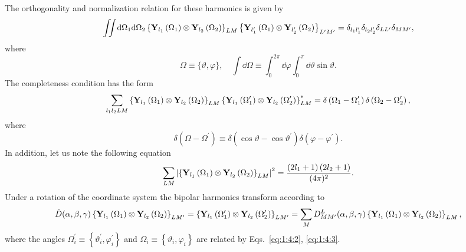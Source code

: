The orthogonality and normalization relation for these harmonics is given by
\begin{equation}
\iint \mathrm{d} \Omega_{1} \mathrm{d} \Omega_{2}\left\{\mathbf{Y}_{l_{1}}\left(\Omega_{1}\right) \otimes \mathbf{Y}_{l_{2}}\left(\Omega_{2}\right)\right\}_{L M}\left\{\mathbf{Y}_{l_{1}^{\prime}}\left(\Omega_{1}\right) \otimes \mathbf{Y}_{l_{2}^{\prime}}\left(\Omega_{2}\right)\right\}_{L^{\prime} M^{\prime}}=\delta_{l_{1} l_{1}^{\prime}} \delta_{l_{2} l_{2}^{\prime}} \delta_{L L^{\prime}} \delta_{M M^{\prime}}, \label{eq:5:16:2}
\end{equation}
where
\[
\Omega \equiv\{\vartheta, \varphi\}, \quad \int \dd \Omega \equiv \int_{0}^{2 \pi} \dd \varphi \int_{0}^{\pi} \dd \vartheta \sin \vartheta.
\]
The completeness condition has the form
\begin{equation}
\sum_{l_{1} l_{2} L M}\left\{\mathbf{Y}_{l_{1}}\left(\Omega_{1}\right) \otimes \mathbf{Y}_{l_{2}}\left(\Omega_{2}\right)\right\}_{L M}\left\{\mathbf{Y}_{l_{1}}\left(\Omega_{1}^{\prime}\right) \otimes \mathbf{Y}_{l_{2}}\left(\Omega_{2}^{\prime}\right)\right\}_{L M}^{*}=\delta\left(\Omega_{1}-\Omega_{1}^{\prime}\right) \delta\left(\Omega_{2}-\Omega_{2}^{\prime}\right), \label{eq:5:16:3}
\end{equation}
where
\[
\delta\left(\Omega-\Omega^{\prime}\right) \equiv \delta\left(\cos \vartheta-\cos \vartheta^{\prime}\right) \delta\left(\varphi-\varphi^{\prime}\right) .
\]
In addition, let us note the following equation
\begin{equation}
\sum_{L M}\left|\left\{\mathbf{Y}_{l_{1}}\left(\Omega_{1}\right) \otimes \mathbf{Y}_{l_{2}}\left(\Omega_{2}\right)\right\}_{L M}\right|^{2}=\frac{\left(2 l_{1}+1\right)\left(2 l_{2}+1\right)}{(4 \pi)^{2}}. \label{eq:5:16:4}
\end{equation}
Under a rotation of the coordinate system the bipolar harmonics transform according to
\begin{equation}
\hat{D}(\alpha, \beta, \gamma)\left\{\mathbf{Y}_{l_{1}}\left(\Omega_{1}\right) \otimes \mathbf{Y}_{l_{2}}\left(\Omega_{2}\right)\right\}_{L M^{\prime}}=\left\{\mathbf{Y}_{l_{1}}\left(\Omega_{1}^{\prime}\right) \otimes \mathbf{Y}_{l_{2}}\left(\Omega_{2}^{\prime}\right)\right\}_{L M^{\prime}}=\sum_{M} D_{M M^{\prime}}^{L}(\alpha, \beta, \gamma)\left\{\mathbf{Y}_{l_{1}}\left(\Omega_{1}\right) \otimes \mathbf{Y}_{l_{2}}\left(\Omega_{2}\right)\right\}_{L M}, \label{eq:5:16:5}
\end{equation}
where the angles $\Omega_{i}^{\prime} \equiv\left\{\vartheta_{i}^{\prime}, \varphi_{i}^{\prime}\right\}$ and $\Omega_{i} \equiv\left\{\vartheta_{i}, \varphi_{i}\right\}$ are related by Eqs.~\eqref{eq:1:4:2}, \eqref{eq:1:4:3}.\\
